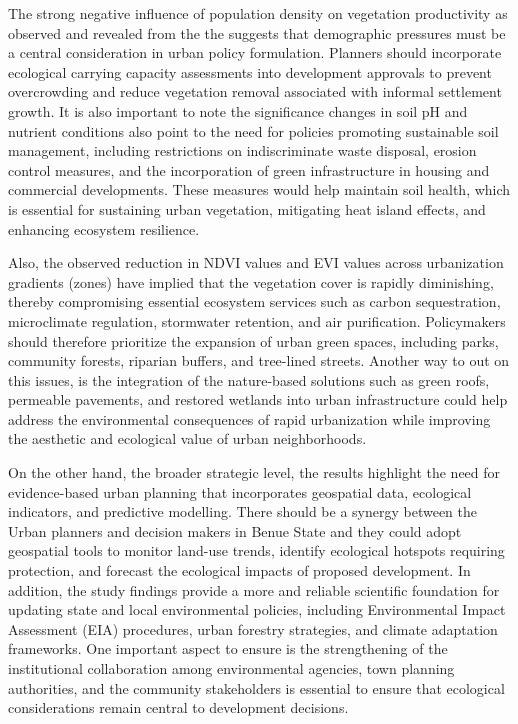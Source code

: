 The strong negative influence of population density on vegetation productivity as observed and revealed from the the suggests that demographic pressures must be a central consideration in urban policy formulation. Planners should incorporate ecological carrying capacity assessments into development approvals to prevent overcrowding and reduce vegetation removal associated with informal settlement growth. It is also important to note the significance changes in soil pH and nutrient conditions also point to the need for policies promoting sustainable soil management, including restrictions on indiscriminate waste disposal, erosion control measures, and the incorporation of green infrastructure in housing and commercial developments. These measures would help maintain soil health, which is essential for sustaining urban vegetation, mitigating heat island effects, and enhancing ecosystem resilience.

Also, the observed reduction in NDVI values and EVI values across urbanization gradients (zones) have implied that the vegetation cover is rapidly diminishing, thereby compromising essential ecosystem services such as carbon sequestration, microclimate regulation, stormwater retention, and air purification. Policymakers should therefore prioritize the expansion of urban green spaces, including parks, community forests, riparian buffers, and tree-lined streets. Another way to out on this issues, is the integration of the nature-based solutions such as green roofs, permeable pavements, and restored wetlands into urban infrastructure could help address the environmental consequences of rapid urbanization while improving the aesthetic and ecological value of urban neighborhoods.

On the other hand, the broader strategic level, the results highlight the need for evidence-based urban planning that incorporates geospatial data, ecological indicators, and predictive modelling. There should be a synergy between the Urban planners and decision makers in Benue State and they could adopt geospatial tools to monitor land-use trends, identify ecological hotspots requiring protection, and forecast the ecological impacts of proposed development. In addition, the study findings provide a more and reliable scientific foundation for updating state and local environmental policies, including Environmental Impact Assessment (EIA) procedures, urban forestry strategies, and climate adaptation frameworks. One important aspect to ensure is the strengthening of the institutional collaboration among environmental agencies, town planning authorities, and the community stakeholders is essential to ensure that ecological considerations remain central to development decisions.


